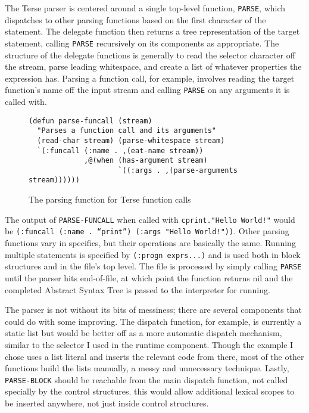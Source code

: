 \documentclass[12pt]{report}
\newcommand{\code}[1]{\texttt{#1}}
\begin{document}
The Terse parser is centered around a single top-level function,
\code{PARSE}, which dispatches to other parsing functions based on the
first character of the statement. The delegate function then returns a
tree representation of the target statement, calling \code{PARSE}
recursively on its components as appropriate. The structure of the
delegate functions is generally to read the selector character off the
stream, parse leading whitespace, and create a list of whatever
properties the expression has. Parsing a function call, for example,
involves reading the target function's name off the input stream and
calling \code{PARSE} on any arguments it is called with.

\begin{figure}
\begin{verbatim}
(defun parse-funcall (stream)
  "Parses a function call and its arguments"
  (read-char stream) (parse-whitespace stream)
  `(:funcall (:name . ,(eat-name stream))
             ,@(when (has-argument stream)
                     `((:args . ,(parse-arguments stream))))))
\end{verbatim}
\caption{The parsing function for Terse function calls}
\end{figure}

The output of \code{PARSE-FUNCALL} when called with
\code{cprint."Hello World!"} would be \code{(:funcall (:name
  . “print”) (:args "Hello World!"))}. Other parsing functions vary in
specifics, but their operations are basically the same. Running
multiple statements is specified by \code{(:progn exprs...)} and is
used both in block structures and in the file's top level. The file is
processed by simply calling \code{PARSE} until the parser hits
end-of-file, at which point the function returns nil and the completed
Abstract Syntax Tree is passed to the interpreter for running.

The parser is not without its bits of messiness; there are several
components that could do with some improving. The dispatch function,
for example, is currently a static list but would be better off as a
more automatic dispatch mechanism, similar to the selector I used in
the runtime component. Though the example I chose uses a list literal
and inserts the relevant code from there, most of the other functions
build the lists manually, a messy and unnecessary technique. Lastly,
\code{PARSE-BLOCK} should be reachable from the main dispatch
function, not called specially by the control structures. this would
allow additional lexical scopes to be inserted anywhere, not just
inside control structures.
\end{document}
